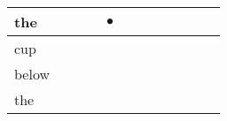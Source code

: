 \documentclass[landscape]{article}
\newcommand{\ssp}{\hspace{2pt}}
\newcommand{\mex}{\cellcolor{g}$\bullet$}
\begin{document}
\begin{tabular}{|l|p{10pt}|p{10pt}|p{10pt}|p{10pt}|p{10pt}|p{10pt}|p{10pt}|p{10pt}|p{10pt}|p{10pt}|p{10pt}|}
\hline
\ssp \cellcolor{ref3}the \ssp&\hspace{2pt}&\hspace{2pt}&\hspace{2pt}&\hspace{2pt}\mex&\hspace{2pt}&\hspace{2pt}&\hspace{2pt}&\hspace{2pt}&\hspace{2pt}&\hspace{2pt}&\hspace{2pt}\\
\hline
\ssp cup \ssp&\hspace{2pt}&\hspace{2pt}&\hspace{2pt}&\hspace{2pt}&\hspace{2pt}&\hspace{2pt}&\hspace{2pt}&\hspace{2pt}&\hspace{2pt}&\hspace{2pt}&\hspace{2pt}\\
\hline
\ssp below \ssp&\hspace{2pt}&\hspace{2pt}&\hspace{2pt}&\hspace{2pt}&\hspace{2pt}&\hspace{2pt}&\hspace{2pt}&\hspace{2pt}&\hspace{2pt}&\hspace{2pt}&\hspace{2pt}\\
\hline
\ssp the \ssp&\hspace{2pt}&\hspace{2pt}&\hspace{2pt}&\hspace{2pt}&\hspace{2pt}&\hspace{2pt}&\hspace{2pt}&\hspace{2pt}&\hspace{2pt}&\hspace{2pt}&\hspace{2pt}\\

\end{tabular}
\end{document}
